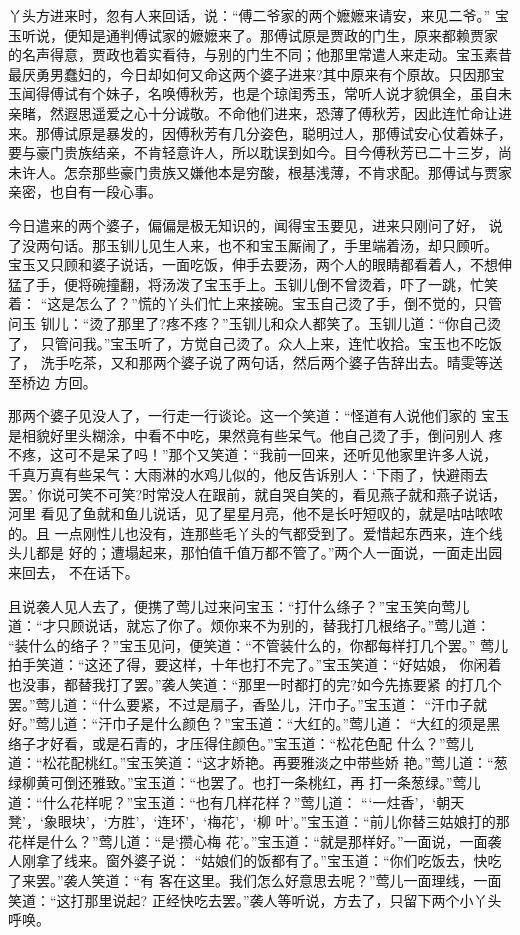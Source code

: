 丫头方进来时，忽有人来回话，说：“傅二爷家的两个嬷嬷来请安，来见二爷。”
宝玉听说，便知是通判傅试家的嬷嬷来了。那傅试原是贾政的门生，原来都赖贾家
的名声得意，贾政也着实看待，与别的门生不同；他那里常遣人来走动。宝玉素昔
最厌勇男蠢妇的，今日却如何又命这两个婆子进来?其中原来有个原故。只因那宝
玉闻得傅试有个妹子，名唤傅秋芳，也是个琼闺秀玉，常听人说才貌俱全，虽自未
亲睹，然遐思遥爱之心十分诚敬。不命他们进来，恐薄了傅秋芳，因此连忙命让进
来。那傅试原是暴发的，因傅秋芳有几分姿色，聪明过人，那傅试安心仗着妹子，
要与豪门贵族结亲，不肯轻意许人，所以耽误到如今。目今傅秋芳已二十三岁，尚
未许人。怎奈那些豪门贵族又嫌他本是穷酸，根基浅薄，不肯求配。那傅试与贾家
亲密，也自有一段心事。

今日遣来的两个婆子，偏偏是极无知识的，闻得宝玉要见，进来只刚问了好，
说了没两句话。那玉钏儿见生人来，也不和宝玉厮闹了，手里端着汤，却只顾听。
宝玉又只顾和婆子说话，一面吃饭，伸手去要汤，两个人的眼睛都看着人，不想伸
猛了手，便将碗撞翻，将汤泼了宝玉手上。玉钏儿倒不曾烫着，吓了一跳，忙笑着：
“这是怎么了？”慌的丫头们忙上来接碗。宝玉自己烫了手，倒不觉的，只管问玉
钏儿：“烫了那里了?疼不疼？”玉钏儿和众人都笑了。玉钏儿道：“你自己烫了，
只管问我。”宝玉听了，方觉自己烫了。众人上来，连忙收拾。宝玉也不吃饭了，
洗手吃茶，又和那两个婆子说了两句话，然后两个婆子告辞出去。晴雯等送至桥边
方回。

那两个婆子见没人了，一行走一行谈论。这一个笑道：“怪道有人说他们家的
宝玉是相貌好里头糊涂，中看不中吃，果然竟有些呆气。他自己烫了手，倒问别人
疼不疼，这可不是呆了吗！”那个又笑道：“我前一回来，还听见他家里许多人说，
千真万真有些呆气：大雨淋的水鸡儿似的，他反告诉别人：‘下雨了，快避雨去罢。’
你说可笑不可笑?时常没人在跟前，就自哭自笑的，看见燕子就和燕子说话，河里
看见了鱼就和鱼儿说话，见了星星月亮，他不是长吁短叹的，就是咕咕哝哝的。且
一点刚性儿也没有，连那些毛丫头的气都受到了。爱惜起东西来，连个线头儿都是
好的；遭塌起来，那怕值千值万都不管了。”两个人一面说，一面走出园来回去，
不在话下。

且说袭人见人去了，便携了莺儿过来问宝玉：“打什么绦子？”宝玉笑向莺儿
道：“才只顾说话，就忘了你了。烦你来不为别的，替我打几根络子。”莺儿道：
“装什么的络子？”宝玉见问，便笑道：“不管装什么的，你都每样打几个罢。”
莺儿拍手笑道：“这还了得，要这样，十年也打不完了。”宝玉笑道：“好姑娘，
你闲着也没事，都替我打了罢。”袭人笑道：“那里一时都打的完?如今先拣要紧
的打几个罢。”莺儿道：“什么要紧，不过是扇子，香坠儿，汗巾子。”宝玉道：
“汗巾子就好。”莺儿道：“汗巾子是什么颜色？”宝玉道：“大红的。”莺儿道：
“大红的须是黑络子才好看，或是石青的，才压得住颜色。”宝玉道：“松花色配
什么？”莺儿道：“松花配桃红。”宝玉笑道：“这才娇艳。再要雅淡之中带些娇
艳。”莺儿道：“葱绿柳黄可倒还雅致。”宝玉道：“也罢了。也打一条桃红，再
打一条葱绿。”莺儿道：“什么花样呢？”宝玉道：“也有几样花样？”莺儿道：
“‘一炷香’，‘朝天凳’，‘象眼块’，‘方胜’，‘连环’，‘梅花’，‘柳
叶’。”宝玉道：“前儿你替三姑娘打的那花样是什么？”莺儿道：“是‘攒心梅
花’。”宝玉道：“就是那样好。”一面说，一面袭人刚拿了线来。窗外婆子说：
“姑娘们的饭都有了。”宝玉道：“你们吃饭去，快吃了来罢。”袭人笑道：“有
客在这里。我们怎么好意思去呢？”莺儿一面理线，一面笑道：“这打那里说起?
正经快吃去罢。”袭人等听说，方去了，只留下两个小丫头呼唤。

